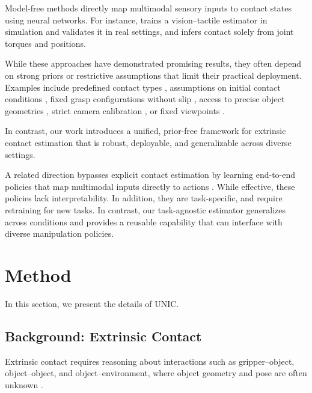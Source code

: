 \documentclass[letterpaper, 10 pt, conference]{ieeeconf}  %
\newcommand{\unic}{\textsc{UNIC}}
\begin{document}
Model-free methods \cite{higuera2023neural, yi2024visual, lee2025vitascope, ota2024tactile, aoyama2025few, fu2025unitac} directly map multimodal sensory inputs to contact states using neural networks. For instance, \cite{lee2025vitascope} trains a vision–tactile estimator in simulation and validates it in real settings, and  \cite{fu2025unitac} infers contact solely from joint torques and positions. 


While these approaches have demonstrated promising results, they often depend on strong priors or restrictive assumptions that limit their practical deployment. Examples include predefined contact types \cite{ma2021extrinsic, ota2024tactile, oller2024tactile}, assumptions on initial contact conditions \cite{kim2023simultaneous}, fixed grasp configurations without slip \cite{higuera2023neural}, access to precise object geometries \cite{lee2025vitascope}, strict camera calibration \cite{lee2025vitascope, oller2024tactile}, or fixed viewpoints \cite{yi2024visual}.

In contrast, our work introduces a unified, prior-free framework for extrinsic contact estimation that is robust, deployable, and generalizable across diverse settings.

A related direction bypasses explicit contact estimation by learning end-to-end policies that map multimodal inputs directly to actions \cite{hansen2022visuotactile, qi2023general, xue2025reactive, liu2025factr, luu2025manifeel, xu2025unit}. While effective, these policies lack interpretability. In addition, they are task-specific, and require retraining for new tasks. In contrast, our task-agnostic estimator generalizes across conditions and provides a reusable capability that can interface with diverse manipulation policies.





\section{Method}
In this section, we present the details of \unic{}.

\subsection{Background: Extrinsic Contact}

Extrinsic contact requires reasoning about interactions such as gripper–object, object–object, and object–environment, where object geometry and pose are often unknown \cite{ma2021extrinsic,rodriguez2021unstable}. 
\end{document}
